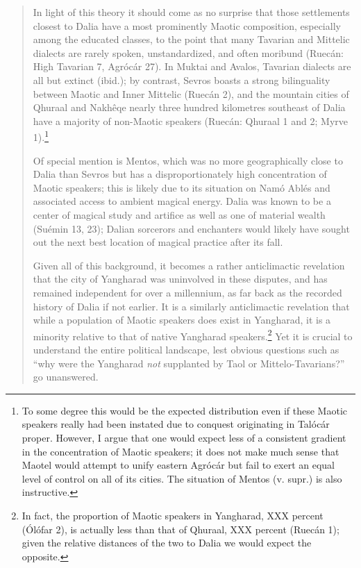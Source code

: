 \documentclass{article}
\begin{document}
\begin{quotation}
In light of this theory it should come as no surprise that those settlements closest to Dalia have a most prominently Maotic composition, especially among the educated classes, to the point that many Tavarian and Mittelic dialects are rarely spoken, unstandardized, and often moribund (Ruecán: High Tavarian 7, Agrócár 27). In Muktai and Avalos, Tavarian dialects are all but extinct (ibid.); by contrast, Sevros boasts a strong bilinguality between Maotic and Inner Mittelic (Ruecán 2), and the mountain cities of Qhuraal and Nakhêqe nearly three hundred kilometres southeast of Dalia have a majority of non-Maotic speakers (Ruecán: Qhuraal 1 and 2; Myrve 1).\footnote{To some degree this would be the expected distribution even if these Maotic speakers really had been instated due to conquest originating in Talócár proper. However, I argue that one would expect less of a consistent gradient in the concentration of Maotic speakers; it does not make much sense that Maotel would attempt to unify eastern Agrócár but fail to exert an equal level of control on all of its cities. The situation of Mentos (v. supr.) is also instructive.}

Of special mention is Mentos, which was no more geographically close to Dalia than Sevros but has a disproportionately high concentration of Maotic speakers; this is likely due to its situation on Namó Ablés and associated access to ambient magical energy. Dalia was known to be a center of magical study and artifice as well as one of material wealth (Suémin 13, 23); Dalian sorcerors and enchanters would likely have sought out the next best location of magical practice after its fall.

Given all of this background, it becomes a rather anticlimactic revelation that the city of Yangharad was uninvolved in these disputes, and has remained independent for over a millennium, as far back as the recorded history of Dalia if not earlier. It is a similarly anticlimactic revelation that while a population of Maotic speakers does exist in Yangharad, it is a minority relative to that of native Yangharad speakers.\footnote{In fact, the proportion of Maotic speakers in Yangharad, XXX percent (Ólófar 2), is actually less than that of Qhuraal, XXX percent (Ruecán 1); given the relative distances of the two to Dalia we would expect the opposite.} Yet it is crucial to understand the entire political landscape, lest obvious questions such as ``why were the Yangharad \emph{not} supplanted by Taol or Mittelo-Tavarians?'' go unanswered.


\end{quotation}
\end{document}
